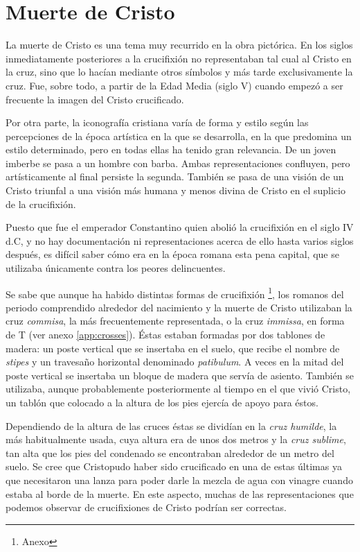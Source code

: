 \section{Muerte de Cristo}
La muerte de Cristo es una tema muy recurrido en la obra pictórica. En los siglos inmediatamente posteriores a la crucifixión no representaban tal cual al Cristo en la cruz, sino que lo hacían mediante otros símbolos y más tarde exclusivamente la cruz. Fue, sobre todo, a partir de la Edad Media (siglo V) cuando empezó a ser frecuente la imagen del Cristo crucificado.

Por otra parte, la iconografía cristiana varía de forma y estilo según las percepciones de la época artística en la que se desarrolla, en la que predomina un estilo determinado, pero en todas ellas ha tenido gran relevancia. De un joven imberbe se pasa a un hombre con barba. Ambas representaciones confluyen, pero artísticamente al final persiste la segunda. También se pasa de una visión de un Cristo triunfal a una visión más humana y menos divina de Cristo en el suplicio de la crucifixión.

Puesto que fue el emperador Constantino quien abolió la crucifixión en el siglo IV d.C, y no hay documentación ni representaciones acerca de ello hasta varios siglos después, es difícil saber cómo era en la época romana esta pena capital, que se utilizaba únicamente contra los peores delincuentes.

Se sabe que aunque ha habido distintas formas de crucifixión \footnote{Anexo}, los romanos del periodo comprendido alrededor del nacimiento y la muerte de Cristo utilizaban la cruz \textit{commisa}, la más frecuentemente representada, o la cruz \textit{immissa}, en forma de T (ver anexo \autoref{app:crosses}). Éstas estaban formadas por dos tablones de madera: un poste vertical que se insertaba en el suelo, que recibe el nombre de \textit{stipes} y un travesaño horizontal denominado \textit{patibulum}. A veces en la mitad del poste vertical se insertaba un bloque de madera que servía de asiento. También se utilizaba, aunque probablemente posteriormente al tiempo en el que vivió Cristo, un tablón que colocado a la altura de los pies ejercía de apoyo para éstos.

Dependiendo de la altura de las cruces éstas se dividían en la \textit{cruz humilde}, la más habitualmente usada, cuya altura era de unos dos metros y la \textit{cruz sublime}, tan alta que los pies del condenado se encontraban alrededor de un metro del suelo. Se cree que Cristopudo haber sido crucificado en una de estas últimas ya que necesitaron una lanza para poder darle la mezcla de agua con vinagre cuando estaba al borde de la muerte. En este aspecto, muchas de las representaciones que podemos observar de crucifixiones de Cristo podrían ser correctas.

